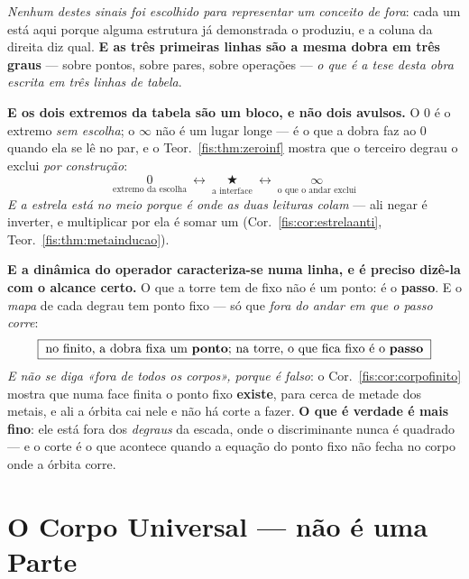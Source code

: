 \documentclass[livro.tex]{subfiles}
\begin{document}
\noindent\emph{Nenhum destes sinais foi escolhido para representar um conceito de
fora}: cada um está aqui porque alguma estrutura já demonstrada o produziu, e a
coluna da direita diz qual. \textbf{E as três primeiras linhas são a mesma dobra em
três graus} --- sobre pontos, sobre pares, sobre operações --- \emph{o que é a tese
desta obra escrita em três linhas de tabela}.

\medskip\noindent\textbf{E os dois extremos da tabela são um bloco, e não dois
avulsos.} O $0$ é o extremo \emph{sem escolha}; o $\infty$ não é um lugar longe ---
é o que a dobra faz ao $0$ quando ela se lê no par, e o Teor.~\ref{fis:thm:zeroinf}
mostra que o terceiro degrau o exclui \emph{por construção}:
\[
\boxed{\;\underset{\text{extremo da escolha}}{0}\ \longleftrightarrow\
\underset{\text{a interface}}{\bigstar}\ \longleftrightarrow\
\underset{\text{o que o andar exclui}}{\infty}\;}
\]
\emph{E a estrela está no meio porque é onde as duas leituras colam} --- ali negar
é inverter, e multiplicar por ela é somar um
(Cor.~\ref{fis:cor:estrelaanti}, Teor.~\ref{fis:thm:metainducao}).

\medskip\noindent\textbf{E a dinâmica do operador caracteriza-se numa linha, e é
preciso dizê-la com o alcance certo.} O que a torre tem de fixo não é um ponto: é
o \textbf{passo}. E o \emph{mapa} de cada degrau tem ponto fixo --- só que \emph{fora do andar em
que o passo corre}:
\[
\boxed{\;\text{no finito, a dobra fixa um \textbf{ponto}; na torre, o que fica fixo é o \textbf{passo}}\;}
\]
\emph{E não se diga «fora de todos os corpos», porque é falso}: o
Cor.~\ref{fis:cor:corpofinito} mostra que numa face finita o ponto fixo
\textbf{existe}, para cerca de metade dos metais, e ali a órbita cai nele e não há
corte a fazer. \textbf{O que é verdade é mais fino}: ele está fora dos
\emph{degraus} da escada, onde o discriminante nunca é quadrado --- e o corte é o
que acontece quando a equação do ponto fixo não fecha no corpo onde a órbita
corre.

\section*{O Corpo Universal --- não é uma Parte}\label{fis:universal}
\addcontentsline{toc}{section}{O Corpo Universal}
\end{document}
